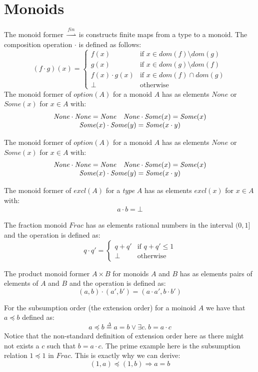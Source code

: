 \documentclass[nocopyrightspace]{sigplanconf}
\newcommand{\defeq}{\overset{\Delta}{=}}
\newcommand{\dom}{\mathit{dom}}
\newcommand{\None}{\mathit{None}}
\newcommand{\Some}{\mathit{Some}}
\newcommand{\option}{\mathit{option}}
\newcommand{\excl}{\mathit{excl}}
\newcommand{\Frac}{\mathit{Frac}}
\newcommand{\finmap}{\overset{\mathit{fin}}{\rightharpoonup}}
\begin{document}



\appendix
\section{Monoids}
The monoid former $\finmap$ is constructs finite maps from a type to a monoid.
The composition operation $\cdot$ is defined as follows:
\[
(f \cdot g) (x) = \left\{
\begin{array}{ll}
f(x) & \text{if } x \in \dom(f)\setminus\dom(g)\\
g(x) & \text{if } x \in \dom(g)\setminus\dom(f)\\
f(x) \cdot g(x) & \text{if } x \in \dom(f)\cap\dom(g)\\
\bot & \text{otherwise}
\end{array}
\right.
\]
The monoid former of $\option(A)$ for a monoid $A$ has as elements 
$\None$ or $\Some(x)$ for $x \in A$ with:
\[
\begin{array}{ll}
\None \cdot \None = \None & \None \cdot \Some(x) = \Some(x) \\
\multicolumn{2}{c}{\Some(x) \cdot \Some(y) = \Some(x \cdot y)}
\end{array}
\]

The monoid former of $\option(A)$ for a monoid $A$ has as elements 
$\None$ or $\Some(x)$ for $x \in A$ with:
\[
\begin{array}{ll}
\None \cdot \None = \None & \None \cdot \Some(x) = \Some(x) \\
\multicolumn{2}{c}{\Some(x) \cdot \Some(y) = \Some(x \cdot y)}
\end{array}
\]

The monoid former of $\excl(A)$ for a \emph{type} $A$ has as elements 
$\excl(x)$ for $x \in A$ with:
\[
\begin{array}{ll}
a \cdot b = \bot
\end{array}
\]

The fraction monoid $\Frac$ has as elements rational numbers in the interval $(0, 1]$ and the operation is defined as:
\[
q \cdot q' = \left\{
\begin{array}{ll}
q + q' & \text{if } q + q' \le 1\\
\bot & \text{otherwise}
\end{array}
\right.
\]

The product monoid former $A \times B$ for monoids $A$ and $B$ has as elements pairs of elements of $A$ and $B$ and the operation is defined as:
\[
(a, b) \cdot (a', b') = (a \cdot a', b \cdot b')
\]

For the subsumption order (the extension order) for a moinoid $A$ we have that $a \preceq b$ defined as:
\[
a \preceq b \defeq a = b \lor \exists c.~b = a \cdot c
\]
Notice that the non-standard definition of extension order here as
there might not exists a $c$ such that $b = a \cdot c$.
The prime example here is the subsumption relation $1 \preceq 1$ in
$\Frac$.
This is exactly why we can derive:
\[
(1, a) \preceq (1, b) \Rightarrow a = b
\]
\end{document}
